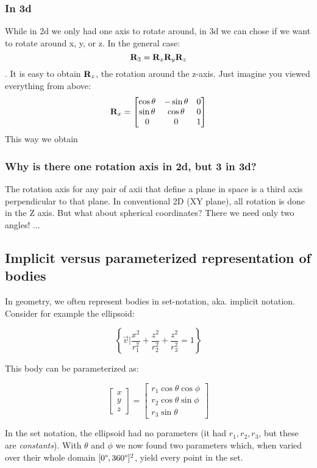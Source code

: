 \subsubsection{In 3d}
While in 2d we only had one axis to rotate around, in 3d we can chose if we want to rotate around x, y, or z. In the general case: 
$$ \mathbf{R}_3 = \mathbf{R}_x \mathbf{R}_y \mathbf{R}_z $$. 
It is easy to obtain $\mathbf{R}_z$, the rotation around the z-axis. Just imagine you viewed everything from above:
$$ \mathbf{R}_x = \begin{bmatrix}
    \cos{\theta} & -\sin{\theta} & 0 \\
    \sin{\theta} & \cos{\theta}   & 0 \\
    0            & 0             & 1
\end{bmatrix}$$
This way we obtain 
$$ $$

\subsubsection{Why is there one rotation axis in 2d, but 3 in 3d?}
The rotation axis for any pair of axii that define a plane in space is a third axis perpendicular to that plane. In conventional 2D (XY plane), all rotation is done in the Z axis. 
But what about spherical coordinates? There we need only two angles! ...

\subsection{Implicit versus parameterized representation of bodies}

In geometry, we often represent bodies in set-notation, aka. implicit notation. Consider for example the ellipsoid: 

$$ \left \{\vec{v} | \frac{x^2}{r_1^2} + \frac{z^2}{r_2^2} + \frac{z^2}{r_3^2} = 1 \right \}$$

This body can be parameterized as: 

$$ \begin{bmatrix}
x \\
y \\
z
\end{bmatrix} = 
\begin{bmatrix}
r_1 \cos{\theta} \cos{\phi} \\
r_2 \cos{\theta} \sin{\phi} \\
r_3 \sin{\theta}
\end{bmatrix} $$

In the set notation, the ellipsoid had no parameters (it had $r_1, r_2, r_3$, but these are \emph{constants}). With $\theta$ and $\phi$ we now found two parameters which, when varied over their whole domain $[0\degree, 360\degree]^2$, yield every point in the set. 


